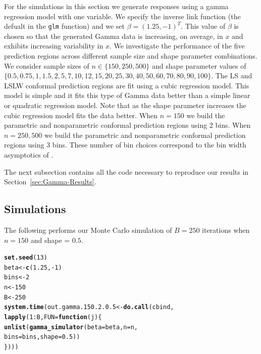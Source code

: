\documentclass[11pt]{article}\usepackage[]{graphicx}\usepackage[]{color}
\makeatletter
\newcommand{\hlnum}[1]{\textcolor[rgb]{0.686,0.059,0.569}{#1}}%
\newcommand{\hlopt}[1]{\textcolor[rgb]{0,0,0}{#1}}%
\newcommand{\hlstd}[1]{\textcolor[rgb]{0.345,0.345,0.345}{#1}}%
\newcommand{\hlkwa}[1]{\textcolor[rgb]{0.161,0.373,0.58}{\textbf{#1}}}%
\newcommand{\hlkwb}[1]{\textcolor[rgb]{0.69,0.353,0.396}{#1}}%
\newcommand{\hlkwc}[1]{\textcolor[rgb]{0.333,0.667,0.333}{#1}}%
\newcommand{\hlkwd}[1]{\textcolor[rgb]{0.737,0.353,0.396}{\textbf{#1}}}%
\newenvironment{kframe}{%
 \def\at@end@of@kframe{}%
 \ifinner\ifhmode%
  \def\at@end@of@kframe{\end{minipage}}%
  \begin{minipage}{\columnwidth}%
 \fi\fi%
 \def\FrameCommand##1{\hskip\@totalleftmargin \hskip-\fboxsep
 \colorbox{shadecolor}{##1}\hskip-\fboxsep
     \hskip-\linewidth \hskip-\@totalleftmargin \hskip\columnwidth}%
 \MakeFramed {\advance\hsize-\width
   \@totalleftmargin\z@ \linewidth\hsize
   \@setminipage}}%
 {\par\unskip\endMakeFramed%
 \at@end@of@kframe}
\newenvironment{knitrout}{}{} %
\makeatother
\begin{document}
For the simulations in this section we generate responses using a gamma 
regression model with one variable.  We specify the inverse link function 
(the defualt in the \texttt{glm} function) and we set 
$\beta = (1.25, -1)^T$.  This value of $\beta$ is chosen so that the generated 
Gamma data is increasing, on average, in $x$ and exhibits increasing 
variability in $x$.  We investigate the performance of the five prediction 
regions across different sample size and shape parameter combinations.  We 
consider sample sizes of $n \in \{150, 250, 500\}$ and shape parameter values 
of $\{0.5, 0.75, 1, 1.5, 2, 5, 7, 10, 12, 15, 20, 25, 30, 40, 50, 60, 70, 80, 90, 100\}$.  
The LS and LSLW conformal prediction regions are fit using a cubic regression 
model.  This model is simple and it fits this type of Gamma data better than a 
simple linear or quadratic regression model.  Note that as the shape parameter 
increases the cubic regression model fits the data better.  When $n = 150$ we 
build the parametric and nonparametric conformal prediction regions using 2 
bins.  When $n = 250, 500$ we build the parametric and nonparametric conformal 
prediction regions using 3 bins.  These number of bin choices correspond to 
the bin width asymptotics of \citet{lei2014distribution}.

The next subsection contains all the code necessary to reproduce our results 
in Section~\ref{sec:Gamma-Results}.



\subsection{Simulations}

The following performs our Monte Carlo simulation of $B = 250$ iterations 
when $n = 150$ and shape = $0.5$.

\begin{knitrout}
\color{fgcolor}\begin{kframe}
\begin{alltt}
\hlkwd{set.seed}\hlstd{(}\hlnum{13}\hlstd{)}
\hlstd{beta} \hlkwb{<-} \hlkwd{c}\hlstd{(}\hlnum{1.25}\hlstd{,} \hlopt{-}\hlnum{1}\hlstd{)}
\hlstd{bins} \hlkwb{<-} \hlnum{2}
\hlstd{n} \hlkwb{<-} \hlnum{150}
\hlstd{B} \hlkwb{<-} \hlnum{250}
\hlkwd{system.time}\hlstd{(out.gamma.150.2.0.5} \hlkwb{<-} \hlkwd{do.call}\hlstd{(cbind,}
  \hlkwd{lapply}\hlstd{(}\hlnum{1}\hlopt{:}\hlstd{B,} \hlkwc{FUN} \hlstd{=} \hlkwa{function}\hlstd{(}\hlkwc{j}\hlstd{)\{}
    \hlkwd{unlist}\hlstd{(}\hlkwd{gamma_simulator}\hlstd{(}\hlkwc{beta} \hlstd{= beta,} \hlkwc{n} \hlstd{= n,}
      \hlkwc{bins} \hlstd{= bins,} \hlkwc{shape} \hlstd{=} \hlnum{0.5}\hlstd{))}
\hlstd{\})))}
\end{alltt}


{\ttfamily\noindent\bfseries\color{errorcolor}{\#\# Error in eval(predvars, data, env): object 'x1' not found}}

{\ttfamily\noindent\itshape\color{messagecolor}{\#\# Timing stopped at: 0.125 0 0.125}}\end{kframe}
\end{knitrout}
\end{document}
